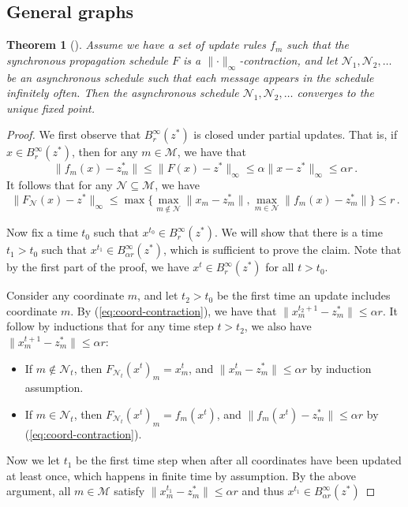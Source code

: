 \documentclass[11pt,a4paper]{article}
\newtheorem{theorem}{Theorem}
\theoremstyle{remark}
\newcommand{\M}{\mathcal{M}}
\newcommand{\N}{\mathcal{N}}
\newcommand{\norm}[1]{\lVert #1 \rVert}
\begin{document}
\subsection{General graphs}

\begin{theorem}[\cite{Bertsekas1983}]
Assume we have a set of update rules $f_m$ such that the synchronous propagation schedule $F$ is a $\norm{\cdot}_\infty$-contraction, and let $\N_1, \N_2, \dotsc$ be an asynchronous schedule such that each message appears in the schedule infinitely often. Then the asynchronous schedule $\N_1, \N_2, \dotsc$ converges to the unique fixed point.
\end{theorem}

\begin{proof} We first observe that $B^\infty_r(z^*)$ is closed under partial updates. That is, if $x \in B^\infty_r(z^*)$, then for any $m \in \M$, we have that
\begin{equation}\label{eq:coord-contraction}
\norm{f_m(x) - z_m^*} \le \norm{F(x) - z^*}_\infty \le \alpha \norm{x - z^*}_\infty \le \alpha r\,.
\end{equation}
It follows that for any $\N \subseteq \M$, we have
\[ \norm{F_\N(x) - z^*}_\infty \le \max \bigl\{ \max_{m \notin \N} \norm{x_m - z_m^*}, \max_{m \in \N} \norm{f_m(x) - z_m^*}  \bigr\} \le r\,.\]
    
Now fix a time $t_0$ such that $x^{t_0} \in B^\infty_r(z^*)$. We will show that there is a time $t_1 > t_0 $ such that $x^{t_1} \in B^\infty_{\alpha r}(z^*)$, which is sufficient to prove the claim. Note that by the first part of the proof, we have $x^t \in B^\infty_r(z^*)$ for all $t > t_0$.

Consider any coordinate $m$, and let $t_2 > t_0$ be the first time an update includes coordinate $m$. By (\ref{eq:coord-contraction}), we have that $\norm{x^{t_2+1}_m - z_m^*} \le \alpha r$. It follow by inductions that for any time step $t > t_2$, we also have $\norm{x^{t+1}_m - z_m^*} \le \alpha r$:
\begin{itemize}
    \item If $m \notin \N_{t}$, then $F_{\N_{t}}(x^{t})_m = x^{t}_m$, and $\norm{x^{t}_m - z_m^*} \le \alpha r$ by induction assumption.
    \item If $m \in \N_{t}$, then $F_{\N_{t}}(x^{t})_m = f_m(x^{t})$, and $\norm{f_m(x^{t}) - z_m^*} \le \alpha r$ by (\ref{eq:coord-contraction}).
\end{itemize}
Now we let $t_1$ be the first time step when after all coordinates have been updated at least once, which happens in finite time by assumption. By the above argument, all $m \in \M$ satisfy $\norm{x^{t_1}_m - z_m^*} \le \alpha r$ and thus $x^{t_1} \in B^\infty_{\alpha r}(z^*)$
\end{proof}
\end{document}
